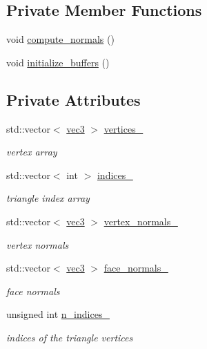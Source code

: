 \subsection*{Private Member Functions}
\begin{DoxyCompactItemize}
\item 
void \hyperlink{classShip_a0303c714554ecf490894f87428a2b7da}{compute\+\_\+normals} ()
\item 
void \hyperlink{classShip_a3f0c77b19ba169d271cdd781e7e1815d}{initialize\+\_\+buffers} ()
\end{DoxyCompactItemize}
\subsection*{Private Attributes}
\begin{DoxyCompactItemize}
\item 
std\+::vector$<$ \hyperlink{classvec3}{vec3} $>$ \hyperlink{classShip_aa6dc51c843eba9a8252c75a0450c0f9a}{vertices\+\_\+}
\begin{DoxyCompactList}\small\item\em vertex array \end{DoxyCompactList}\item 
std\+::vector$<$ int $>$ \hyperlink{classShip_af738fb884346cf28830f326a10d998fd}{indices\+\_\+}
\begin{DoxyCompactList}\small\item\em triangle index array \end{DoxyCompactList}\item 
std\+::vector$<$ \hyperlink{classvec3}{vec3} $>$ \hyperlink{classShip_a19f863867223a90ba40f177da69a740c}{vertex\+\_\+normals\+\_\+}
\begin{DoxyCompactList}\small\item\em vertex normals \end{DoxyCompactList}\item 
std\+::vector$<$ \hyperlink{classvec3}{vec3} $>$ \hyperlink{classShip_aa7d1b82de97e0574a87c7d5abfee7fd3}{face\+\_\+normals\+\_\+}
\begin{DoxyCompactList}\small\item\em face normals \end{DoxyCompactList}\item 
unsigned int \hyperlink{classShip_a16d302502e0fd72f2f550deb8d7a94b3}{n\+\_\+indices\+\_\+}
\begin{DoxyCompactList}\small\item\em indices of the triangle vertices \end{DoxyCompactList}\item 

\end{DoxyCompactItemize}
